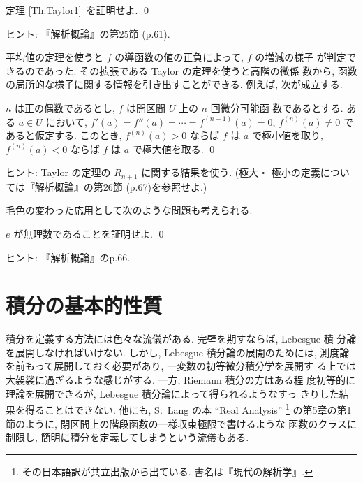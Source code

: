 \documentclass[12pt,twoside]{jarticle}
\begin{document}
\begin{question}\qstar{*}
  定理 \ref{Th:Taylor1}\ を証明せよ. \qed
\end{question}

\noindent ヒント: 『解析概論』の第25節 (p.61).

平均値の定理を使うと $f$ の導函数の値の正負によって, $f$ の増減の様子
が判定できるのであった. その拡張である Taylor の定理を使うと高階の微係
数から, 函数の局所的な様子に関する情報を引き出すことができる. 例えば, 
次が成立する.

\begin{question}
  $n$ は正の偶数であるとし, $f$ は開区間 $U$ 上の $n$ 回微分可能函
  数であるとする. ある $a\in U$ において, %
  $f'(a) = f''(a) = \cdots = f^{(n-1)}(a) = 0$, $f^{(n)}(a) \ne 0$ で
  あると仮定する. %
  このとき, $f^{(n)}(a) > 0$ ならば $f$ は $a$ で極小値を取り, %
  $f^{(n)}(a) < 0$ ならば $f$ は $a$ で極大値を取る. \qed
\end{question}

\noindent ヒント: Taylor の定理の $R_{n+1}$ に関する結果を使う. (極大・
極小の定義については『解析概論』の第26節 (p.67)を参照せよ.)

毛色の変わった応用として次のような問題も考えられる.

\begin{question}\qstar{*}
  $e$ が無理数であることを証明せよ. \qed
\end{question}

\noindent ヒント: 『解析概論』のp.66. 


\section{積分の基本的性質}

積分を定義する方法には色々な流儀がある. 完壁を期すならば, Lebesgue 積
分論を展開しなければいけない. しかし, Lebesgue 積分論の展開のためには, 
測度論を前もって展開しておく必要があり, 一変数の初等微分積分学を展開す
る上では大袈裟に過ぎるような感じがする. 一方, Riemann 積分の方はある程
度初等的に理論を展開できるが, Lebesgue 積分論によって得られるようなすっ
きりした結果を得ることはできない. 他にも, S.~Lang の本
``Real Analysis''%
\footnote{その日本語訳が共立出版から出ている. 書名は『現代の解析学』.}%
の第5章の第1節のように, 閉区間上の階段函数の一様収束極限で書けるような
函数のクラスに制限し, 簡明に積分を定義してしまうという流儀もある.
\end{document}
